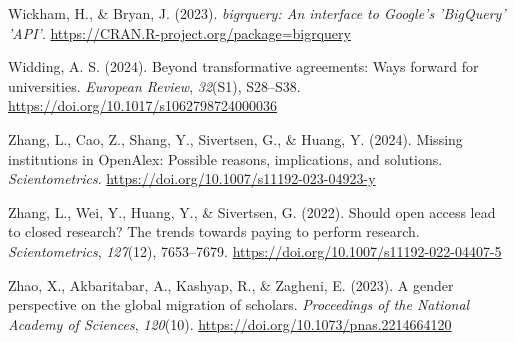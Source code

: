 \documentclass[a4paper,man,floatsintext,longtable,noextraspace,12pt]{apa6}
\newlength{\cslhangindent}
\newenvironment{CSLReferences}[2] %
  {\begin{list}{}{%
   \setlength{\itemindent}{0pt}
   \setlength{\leftmargin}{0pt}
   \setlength{\parsep}{0pt}
   \ifodd #1
    \setlength{\leftmargin}{\cslhangindent}
    \setlength{\itemindent}{-1\cslhangindent}
   \fi
   \setlength{\itemsep}{#2\baselineskip}}}
  {\end{list}}
\begin{document}
\begin{CSLReferences}{1}{0}
Wickham, H., \& Bryan, J. (2023). \emph{{bigrquery: An interface to
Google's 'BigQuery' 'API'}}.
\url{https://CRAN.R-project.org/package=bigrquery}

Widding, A. S. (2024). Beyond transformative agreements: Ways forward
for universities. \emph{European Review}, \emph{32}(S1), S28--S38.
\url{https://doi.org/10.1017/s1062798724000036}

Zhang, L., Cao, Z., Shang, Y., Sivertsen, G., \& Huang, Y. (2024).
Missing institutions in OpenAlex: Possible reasons, implications, and
solutions. \emph{Scientometrics}.
\url{https://doi.org/10.1007/s11192-023-04923-y}

Zhang, L., Wei, Y., Huang, Y., \& Sivertsen, G. (2022). Should open
access lead to closed research? The trends towards paying to perform
research. \emph{Scientometrics}, \emph{127}(12), 7653--7679.
\url{https://doi.org/10.1007/s11192-022-04407-5}

Zhao, X., Akbaritabar, A., Kashyap, R., \& Zagheni, E. (2023). A gender
perspective on the global migration of scholars. \emph{Proceedings of
the National Academy of Sciences}, \emph{120}(10).
\url{https://doi.org/10.1073/pnas.2214664120}

\end{CSLReferences}
\end{document}

